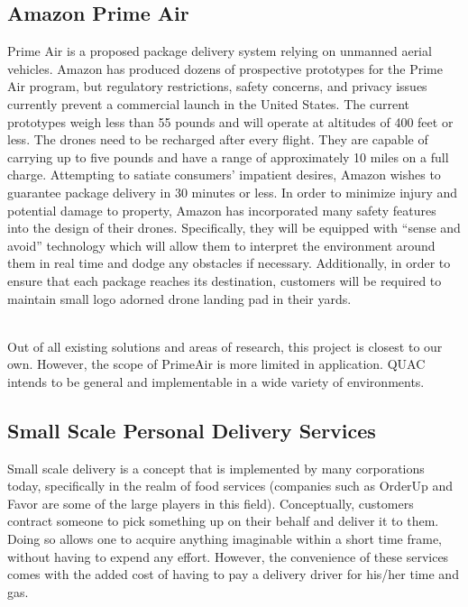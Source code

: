 \documentclass[12pt]{extarticle}
\begin{document}
\subsection{Amazon Prime Air}

Prime Air is a proposed package delivery system relying on unmanned aerial vehicles.  Amazon has produced dozens of prospective prototypes for the Prime Air program, but regulatory restrictions, safety concerns, and privacy issues currently prevent a commercial launch in the United States.  The current prototypes weigh less than 55 pounds and will operate at altitudes of 400 feet or less.  The drones need to be recharged after every flight.  They are capable of carrying up to five pounds and have a range of approximately 10 miles on a full charge.  Attempting to satiate consumers' impatient desires, Amazon wishes to guarantee package delivery in 30 minutes or less.  In order to minimize injury and potential damage to property, Amazon has incorporated many safety features into the design of their drones.  Specifically, they will be equipped with “sense and avoid” technology which will allow them to interpret the environment around them in real time and dodge any obstacles if necessary.  Additionally, in order to ensure that each package reaches its destination, customers will be required to maintain small logo adorned drone landing pad in their yards.  

\ \\
Out of all existing solutions and areas of research, this project is closest to our own.  However, the scope of PrimeAir is more limited in application.  QUAC intends to be general and implementable in a wide variety of environments.  

\subsection{Small Scale Personal Delivery Services} 

Small scale delivery is a concept that is implemented by many corporations today, specifically in the realm of food services (companies such as OrderUp and Favor are some of the large players in this field).  Conceptually, customers contract someone to pick something up on their behalf and deliver it to them.  Doing so allows one to acquire anything imaginable within a short time frame, without having to expend any effort.  However, the convenience of these services comes with the added cost of having to pay a delivery driver for his/her time and gas.  
\end{document}
